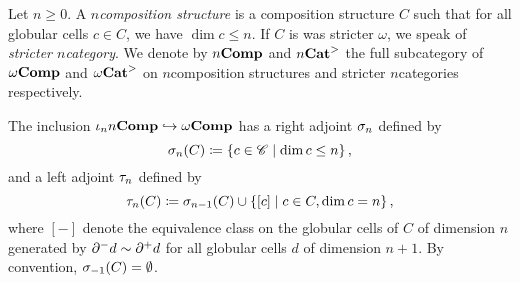 
\begin{dfn} 
    Let \( n \geq 0 \).
    A \emph{\( n \)\nbd composition structure} is a composition structure \( C \) such that for all globular cells \( c \in C \), we have \( \dim c \le n \).
    If \( C \) is was stricter \( \omega \), we speak of \emph{stricter \( n \)\nbd category}.
    We denote by \( {n\mathbf{Comp}} \) and \( {n\mathbf{Cat}}^> \) the full subcategory of \( \omega\mathbf{Comp} \) and \( {\omega\mathbf{Cat}}^> \) on \( n \)\nbd composition structures and stricter \( n \)\nbd categories respectively. 
\end{dfn}

\begin{dfn} 
    The inclusion \( \iota_n {n\mathbf{Comp}} \hookrightarrow \omega\mathbf{Comp} \) has a right adjoint \( \sigma_{n} \) defined by
    \begin{equation*}
        \sigma_{n}(C) \coloneqq \left\{ {c \in \mathscr{C} \mid \dim c \le n} \right\},
    \end{equation*}
    and a left adjoint \( \tau_{n} \) defined by
    \begin{equation*}
        \tau_{n}(C) \coloneqq \sigma_{n - 1}(C) \cup \left\{ {[c] \mid c \in C, \dim c = n} \right\},
    \end{equation*}
    where \( [-] \) denote the equivalence class on the globular cells of \( C \) of dimension \( n \) generated by \( \partial_{}^{-} d \sim \partial_{}^{+} d \) for all globular cells \( d \) of dimension \( n + 1 \). 
    By convention, \( \sigma_{-1}(C) = \emptyset \).
\end{dfn}

